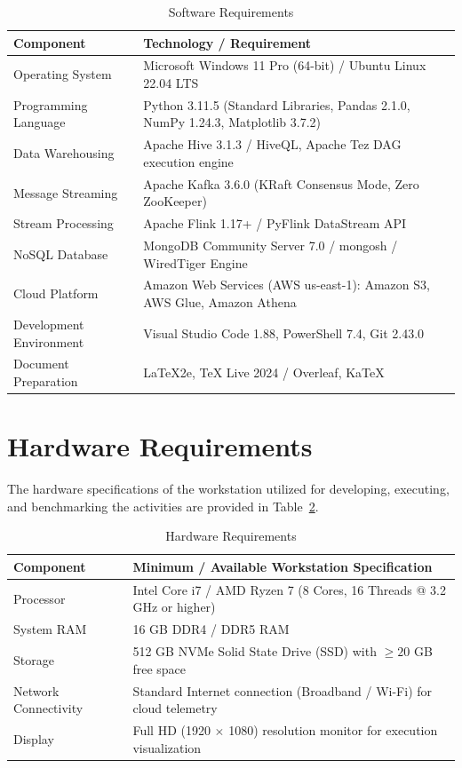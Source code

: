 \documentclass[12pt,a4paper]{report}
\begin{document}
\begin{table}[H]
\centering
\caption{Software Requirements}
\label{tab:software_requirements}
\begin{tabularx}{\textwidth}{|l|X|}
\hline
\textbf{Component} & \textbf{Technology / Requirement}\\
\hline
Operating System & Microsoft Windows 11 Pro (64-bit) / Ubuntu Linux 22.04 LTS\\
\hline
Programming Language & Python 3.11.5 (Standard Libraries, Pandas 2.1.0, NumPy 1.24.3, Matplotlib 3.7.2)\\
\hline
Data Warehousing & Apache Hive 3.1.3 / HiveQL, Apache Tez DAG execution engine\\
\hline
Message Streaming & Apache Kafka 3.6.0 (KRaft Consensus Mode, Zero ZooKeeper)\\
\hline
Stream Processing & Apache Flink 1.17+ / PyFlink DataStream API\\
\hline
NoSQL Database & MongoDB Community Server 7.0 / mongosh / WiredTiger Engine\\
\hline
Cloud Platform & Amazon Web Services (AWS us-east-1): Amazon S3, AWS Glue, Amazon Athena\\
\hline
Development Environment & Visual Studio Code 1.88, PowerShell 7.4, Git 2.43.0\\
\hline
Document Preparation & LaTeX2e, TeX Live 2024 / Overleaf, KaTeX\\
\hline
\end{tabularx}
\end{table}

\section{Hardware Requirements}
The hardware specifications of the workstation utilized for developing, executing, and benchmarking the activities are provided in Table~\ref{tab:hardware_requirements}.

\begin{table}[H]
\centering
\caption{Hardware Requirements}
\label{tab:hardware_requirements}
\begin{tabularx}{\textwidth}{|l|X|}
\hline
\textbf{Component} & \textbf{Minimum / Available Workstation Specification}\\
\hline
Processor & Intel Core i7 / AMD Ryzen 7 (8 Cores, 16 Threads @ 3.2 GHz or higher)\\
\hline
System RAM & 16 GB DDR4 / DDR5 RAM\\
\hline
Storage & 512 GB NVMe Solid State Drive (SSD) with $\ge 20$ GB free space\\
\hline
Network Connectivity & Standard Internet connection (Broadband / Wi-Fi) for cloud telemetry\\
\hline
Display & Full HD (1920 $\times$ 1080) resolution monitor for execution visualization\\
\hline
\end{tabularx}
\end{table}
\end{document}
